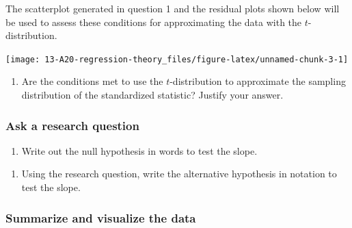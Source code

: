 \documentclass[
]{report}
\providecommand{\tightlist}{%
  \setlength{\itemsep}{0pt}\setlength{\parskip}{0pt}}
\begin{document}
\newpage

The scatterplot generated in question 1 and the residual plots shown below will be used to assess these conditions for approximating the data with the \(t\)-distribution.

\begin{center}\texttt{[image: 13-A20-regression-theory\_files/figure-latex/unnamed-chunk-3-1]} \end{center}

\begin{enumerate}
\def\labelenumi{\arabic{enumi}.}
\setcounter{enumi}{1}
\tightlist
\item
  Are the conditions met to use the \(t\)-distribution to approximate the sampling distribution of the standardized statistic? Justify your answer.
\end{enumerate}

\vspace{1.5in}

\hypertarget{ask-a-research-question-6}{%
\subsubsection*{Ask a research question}\label{ask-a-research-question-6}}

\begin{enumerate}
\def\labelenumi{\arabic{enumi}.}
\setcounter{enumi}{2}
\tightlist
\item
  Write out the null hypothesis in words to test the slope.
\end{enumerate}

\vspace{1in}

\begin{enumerate}
\def\labelenumi{\arabic{enumi}.}
\setcounter{enumi}{3}
\tightlist
\item
  Using the research question, write the alternative hypothesis in notation to test the slope.
\end{enumerate}

\newpage

\hypertarget{summarize-and-visualize-the-data-6}{%
\subsubsection*{Summarize and visualize the data}\label{summarize-and-visualize-the-data-6}}
\end{document}
